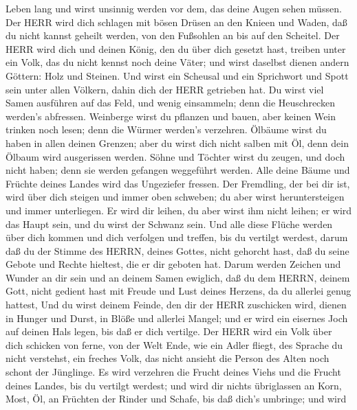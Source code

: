 Leben lang  und wirst unsinnig werden vor dem, das deine
Augen sehen müssen.  Der HERR wird dich schlagen mit bösen
Drüsen an den Knieen und Waden, daß du nicht kannst geheilt werden, von
den Fußsohlen an bis auf den Scheitel.  Der HERR wird dich
und deinen König, den du über dich gesetzt hast, treiben unter ein Volk,
das du nicht kennst noch deine Väter; und wirst daselbst dienen andern
Göttern: Holz und Steinen.  Und wirst ein Scheusal und ein
Sprichwort und Spott sein unter allen Völkern, dahin dich der HERR
getrieben hat.  Du wirst viel Samen ausführen auf das Feld,
und wenig einsammeln; denn die Heuschrecken werden's abfressen.
 Weinberge wirst du pflanzen und bauen, aber keinen Wein
trinken noch lesen; denn die Würmer werden's verzehren. 
Ölbäume wirst du haben in allen deinen Grenzen; aber du wirst dich nicht
salben mit Öl, denn dein Ölbaum wird ausgerissen werden. 
Söhne und Töchter wirst du zeugen, und doch nicht haben; denn sie werden
gefangen weggeführt werden.  Alle deine Bäume und Früchte
deines Landes wird das Ungeziefer fressen.  Der Fremdling,
der bei dir ist, wird über dich steigen und immer oben schweben; du aber
wirst heruntersteigen und immer unterliegen.  Er wird dir
leihen, du aber wirst ihm nicht leihen; er wird das Haupt sein, und du
wirst der Schwanz sein.  Und alle diese Flüche werden über
dich kommen und dich verfolgen und treffen, bis du vertilgt werdest,
darum daß du der Stimme des HERRN, deines Gottes, nicht gehorcht hast,
daß du seine Gebote und Rechte hieltest, die er dir geboten hat.
 Darum werden Zeichen und Wunder an dir sein und an deinem
Samen ewiglich,  daß du dem HERRN, deinem Gott, nicht
gedient hast mit Freude und Lust deines Herzens, da du allerlei genug
hattest,  Und du wirst deinem Feinde, den dir der HERR
zuschicken wird, dienen in Hunger und Durst, in Blöße und allerlei
Mangel; und er wird ein eisernes Joch auf deinen Hals legen, bis daß er
dich vertilge.  Der HERR wird ein Volk über dich schicken
von ferne, von der Welt Ende, wie ein Adler fliegt, des Sprache du nicht
verstehst,  ein freches Volk, das nicht ansieht die Person
des Alten noch schont der Jünglinge.  Es wird verzehren die
Frucht deines Viehs und die Frucht deines Landes, bis du vertilgt
werdest; und wird dir nichts übriglassen an Korn, Most, Öl, an Früchten
der Rinder und Schafe, bis daß dich's umbringe;  und wird
